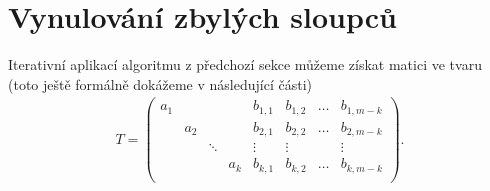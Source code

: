 \section{Vynulování zbylých sloupců}
Iterativní aplikací algoritmu z předchozí sekce můžeme získat matici ve tvaru
(toto ještě formálně dokážeme v následující části)
\begin{align} \label{extra_cols}
T =
    \left(
    \begin{array}{cccc|cccc}
        a_1 &     &        &     & b_{1,1} & b_{1,2} & \hdots & b_{1,m-k} \\
            & a_2 &        &     & b_{2,1} & b_{2,2} & \hdots & b_{2,m-k} \\
            &     & \ddots &     & \vdots  & \vdots  &        & \vdots    \\
            &     &        & a_k & b_{k,1} & b_{k,2} & \hdots & b_{k,m-k} \\
    \end{array}
    \right).
\end{align}

